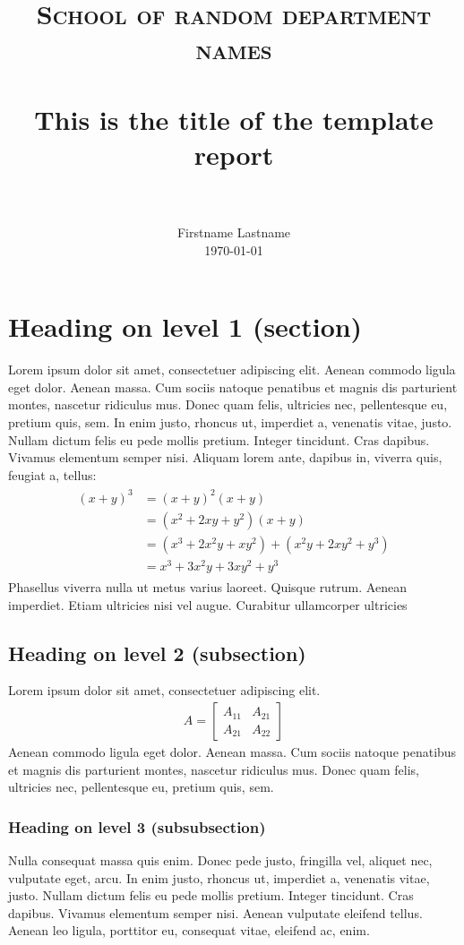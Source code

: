 \documentclass[paper=a4, fontsize=11pt]{scrartcl}
\title{
  \usefont{OT1}{bch}{b}{n}
  \normalfont \normalsize \textsc{School of random department names} \\ [25pt]
  \horrule{0.5pt} \\[0.4cm]
  \huge This is the title of the template report \\
  \horrule{2pt} \\[0.5cm]
}
\author{
  \normalfont         \normalsize
        Firstname Lastname\\[-3pt]  \normalsize
        \today
}
\date{}
\numberwithin{equation}{section}  %
\numberwithin{figure}{section}   %
\numberwithin{table}{section}    %
\begin{document}
\maketitle
\section{Heading on level 1 (section)}
Lorem ipsum dolor sit amet, consectetuer adipiscing elit. Aenean commodo ligula eget dolor. Aenean massa. Cum sociis natoque penatibus et magnis dis parturient montes, nascetur ridiculus mus. Donec quam felis, ultricies nec, pellentesque eu, pretium quis, sem. In enim justo, rhoncus ut, imperdiet a, venenatis vitae, justo. Nullam dictum felis eu pede mollis pretium. Integer tincidunt. Cras dapibus. Vivamus elementum semper nisi. Aliquam lorem ante, dapibus in, viverra quis, feugiat a, tellus:
\begin{align} 
 \begin{split}
 (x+y)^3  &= (x+y)^2(x+y)\\
     &=(x^2+2xy+y^2)(x+y)\\
     &=(x^3+2x^2y+xy^2) + (x^2y+2xy^2+y^3)\\
     &=x^3+3x^2y+3xy^2+y^3
 \end{split}     
\end{align}
Phasellus viverra nulla ut metus varius laoreet. Quisque rutrum. Aenean imperdiet. Etiam ultricies nisi vel augue. Curabitur ullamcorper ultricies 

\subsection{Heading on level 2 (subsection)}
Lorem ipsum dolor sit amet, consectetuer adipiscing elit. 
\begin{align}
 A = 
 \begin{bmatrix}
 A_{11} & A_{21} \\
   A_{21} & A_{22}
 \end{bmatrix}
\end{align}
Aenean commodo ligula eget dolor. Aenean massa. Cum sociis natoque penatibus et magnis dis parturient montes, nascetur ridiculus mus. Donec quam felis, ultricies nec, pellentesque eu, pretium quis, sem.

\subsubsection{Heading on level 3 (subsubsection)}
Nulla consequat massa quis enim. Donec pede justo, fringilla vel, aliquet nec, vulputate eget, arcu. In enim justo, rhoncus ut, imperdiet a, venenatis vitae, justo. Nullam dictum felis eu pede mollis pretium. Integer tincidunt. Cras dapibus. Vivamus elementum semper nisi. Aenean vulputate eleifend tellus. Aenean leo ligula, porttitor eu, consequat vitae, eleifend ac, enim.
\end{document}
